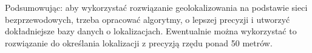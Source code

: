 Podsumowując: aby wykorzystać rozwiązanie geolokalizowania na podstawie sieci bezprzewodowych, trzeba opracować algorytmy, o lepszej precyzji i utworzyć dokładniejsze bazy danych o lokalizacjach. Ewentualnie można wykorzystać to rozwiązanie do określania lokalizacji z precyzją rzędu ponad 50 metrów.
